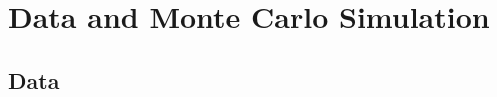 

\chapter{Data and Monte Carlo Simulation}

\ifpdf
    \graphicspath{{chapter-mc/Figs/Raster/}{chapter-mc/Figs/PDF/}{chapter-mc/Figs/}}
\else
    \graphicspath{{chapter-mc/Figs/Vector/}{chapter-mc/Figs/}}
\fi

\section{Data}\label{sec:data}

